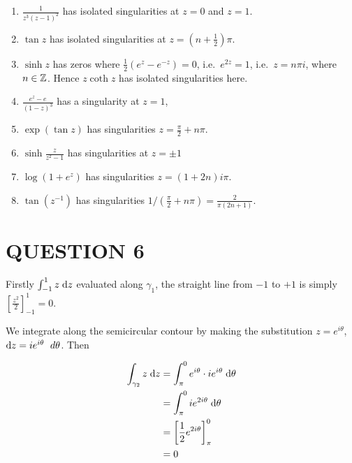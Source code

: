\documentclass[a4paper]{article}
\begin{document}
\begin{enumerate}
	\item $ \frac{1}{z^{3}(z-1)^{2}} $ has isolated singularities at $ z = 0 $ and $ z = 1 $.
	
	\item $ \tan z $ has isolated singularities at $ z = (n + \frac{1}{2}) \pi $.
	
	\item  $\sinh z$ has zeros where $\frac{1}{2}(e^z - e^{-z}) = 0$, i.e.\ $e^{2z} = 1$, i.e.\ $z = n \pi i$, where $n \in \mathbb{Z}$. Hence $ z \coth z $ has isolated singularities here. 
	
	\item $ \frac{e^{z} - e}{(1-z)^{3}} $ has a singularity at $ z = 1 $, 
	
	\item $ \exp(\tan z) $ has singularities $ z = \frac{\pi}{2} + n \pi $.
	
	\item $ \sinh \frac{z}{z^{2} - 1} $ has singularities at $ z = \pm 1 $
	
	\item $ \log(1+e^{z}) $ has singularities $ z = ( 1 + 2n )i \pi  $. 
	
	\item $ \tan(z^{-1}) $ has singularities $ 1/(  \frac{\pi}{2} + n \pi  ) = \frac{2}{\pi(2n+1)} $.
	
\end{enumerate}





\section{QUESTION 6}


Firstly $ \int_{-1}^{1} z \; \mathrm{d} z $ evaluated along $ \gamma_{1} $, the straight line from $ -1 $ to $ +1 $ is simply $ \left[  \frac{z^{2}}{2} \right]_{-1}^{1} = 0 $. 

We integrate along the semicircular contour by making the substitution $ z = e^{i \theta} $, $ \mathrm{d} z = i e^{i \theta} \; \ d \theta $. Then

\begin{align*}
\int_{\gamma_{2}} z \; \mathrm{d} z & = \int_{\pi}^{0} e^{i \theta} \cdot i e^{i \theta} \; \mathrm{d} \theta  \\
& = \int_{\pi}^{0} i e^{2i \theta} \; \mathrm{d} \theta \\
& = \left[ \frac{1}{2} e^{2 i \theta}  \right]_{\pi}^{0} \\
& = 0
\end{align*}
\end{document}
